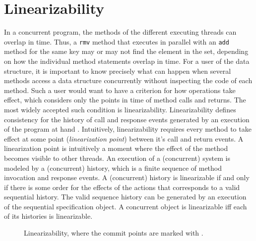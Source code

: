 \section*{Linearizability}      
\label{section:specification:concurrent:data:structure}     
%         
\begingroup%
In a concurrent program, the methods of the different executing threads can overlap in time. Thus, a {\tt rmv} method that
executes in parallel with an {\tt add} method for the same key may or may not
find the element in the set, depending on how the individual method statements
overlap in time. For a user of the data structure, it is important to know precisely
what can happen when several methods access a data structure concurrently
without inspecting the code of each method. Such a user would want to have
a criterion for how operations take effect, which considers only the points in
time of method calls and returns. The most widely accepted such condition is
linearizability.  
Linearizability defines consistency for the history
of call and response events generated by an execution of the program at hand \cite{HeWi:linearizability}. Intuitively, linearizability requires every method to take effect
at some point ({\emph {linearization point}}) between it's call and return events. A linearization point is intuitively a moment where the effect of the method
becomes visible to other threads. An execution of a (concurrent) system is modeled by a (concurrent) history, which is a finite
sequence of method invocation and response events. A (concurrent) history is linearizable if and only if there is some order for
the effects of the actions that corresponds to a valid sequential history. The valid sequence history can be generated by an execution of the sequential specification object. A concurrent object is linearizable iff each of its histories
is linearizable.

\setlength\intextsep{\dazintextsep}
\begin{figure}[ht]
  \centering
  \caption{Linearizability, where the commit points are marked with \protect\commitpoint{}.}
  \label{figure:shape:linearizability}  
\end{figure}          
  

